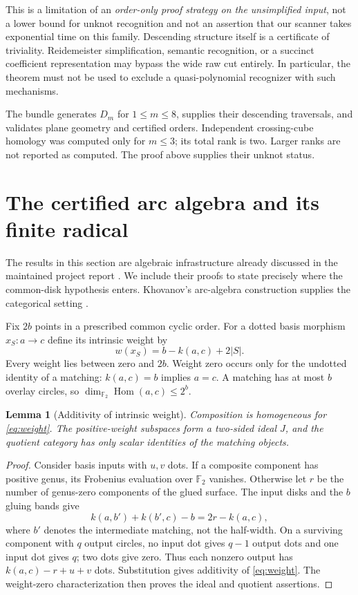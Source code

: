 \documentclass[11pt]{article}
\newtheorem{lemma}[theorem]{Lemma}
\theoremstyle{definition}\newtheorem{definition}[theorem]{Definition}
\theoremstyle{remark}\newtheorem{remark}[theorem]{Remark}
\newcommand{\F}{{\mathbb F_2}}
\newcommand{\Hom}{\operatorname{Hom}}
\begin{document}
This is a limitation of an \emph{order-only proof strategy on the unsimplified
input}, not a lower bound for unknot recognition and not an assertion that our
scanner takes exponential time on this family. Descending structure itself is
a certificate of triviality. Reidemeister simplification, semantic recognition,
or a succinct coefficient representation may bypass the wide raw cut entirely.
In particular, the theorem must not be used to exclude a quasi-polynomial
recognizer with such mechanisms.

The bundle generates $D_m$ for $1\le m\le8$, supplies their descending traversals,
and validates plane geometry and certified orders. Independent crossing-cube
homology was computed only for $m\le3$; its total rank is two. Larger ranks are
not reported as computed. The proof above supplies their unknot status.



\section{The certified arc algebra and its finite radical}
\label{sec:radical}
The results in this section are algebraic infrastructure already discussed in the
maintained project report \cite{RepoRadical}. We include their proofs to state
precisely where the common-disk hypothesis enters. Khovanov's arc-algebra
construction supplies the categorical setting \cite{Khovanov2002}.

Fix $2b$ points in a prescribed common cyclic order. For a dotted basis morphism
$x_S:a\to c$ define its intrinsic weight by
\begin{equation}\label{eq:weight}
 w(x_S)=b-k(a,c)+2|S|.
\end{equation}
Every weight lies between zero and $2b$. Weight zero occurs only for the undotted
identity of a matching: $k(a,c)=b$ implies $a=c$. A matching has at most $b$ overlay
circles, so $\dim_\F\Hom(a,c)\le2^b$.

\begin{lemma}[Additivity of intrinsic weight]\label{lem:weight}
Composition is homogeneous for \eqref{eq:weight}. The positive-weight subspaces
form a two-sided ideal $J$, and the quotient category has only scalar identities
of the matching objects.
\end{lemma}
\begin{proof}
Consider basis inputs with $u,v$ dots. If a composite component has positive
genus, its Frobenius evaluation over $\F$ vanishes. Otherwise let $r$ be the number
of genus-zero components of the glued surface. The input disks and the $b$ gluing
bands give
\[
 k(a,b')+k(b',c)-b=2r-k(a,c),
\]
where $b'$ denotes the intermediate matching, not the half-width. On a surviving
component with $q$ output circles, no input dot gives $q-1$ output dots and one
input dot gives $q$; two dots give zero. Thus each nonzero output has
$k(a,c)-r+u+v$ dots. Substitution gives additivity of \eqref{eq:weight}.
The weight-zero characterization then proves the ideal and quotient assertions.
\end{proof}
\end{document}
